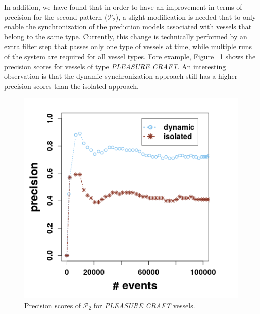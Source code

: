 In addition, we have found that in order to have an improvement in terms of precision for the second pattern ($\mathcal{P}_2$), a slight modification is needed that to only enable the synchronization of the prediction models associated with vessels that belong to the same type. Currently, this change is technically performed by an extra filter step that passes only one type of vessels at time, while multiple runs of the system are required for all vessel types. Fore example, Figure ~\ref{fig:precsions_p2} shows the precision scores for vessels of type \textit{PLEASURE CRAFT}. An interesting observation is that the dynamic synchronization approach still has  a higher precision scores than the isolated approach. 


 \begin{figure}[h]
	
	\includegraphics[width=.5\textwidth]{figures/precision_p2.png}
	
	\caption{Precision scores of $\mathcal{P}_2$  for \textit{PLEASURE CRAFT} vessels.}
	\label{fig:precsions_p2}
\end{figure}





























